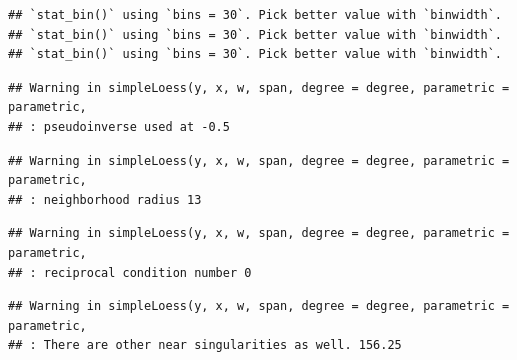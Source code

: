 \documentclass[
]{article}
\newenvironment{Shaded}{\begin{snugshade}}{\end{snugshade}}
\newcommand{\AttributeTok}[1]{\textcolor[rgb]{0.13,0.29,0.53}{#1}}
\newcommand{\FunctionTok}[1]{\textcolor[rgb]{0.13,0.29,0.53}{\textbf{#1}}}
\newcommand{\NormalTok}[1]{#1}
\newcommand{\OtherTok}[1]{\textcolor[rgb]{0.56,0.35,0.01}{#1}}
\newcommand{\SpecialCharTok}[1]{\textcolor[rgb]{0.81,0.36,0.00}{\textbf{#1}}}
\newcommand{\StringTok}[1]{\textcolor[rgb]{0.31,0.60,0.02}{#1}}
\begin{document}
\begin{Shaded}
\end{Shaded}

\begin{verbatim}
## `stat_bin()` using `bins = 30`. Pick better value with `binwidth`.
## `stat_bin()` using `bins = 30`. Pick better value with `binwidth`.
## `stat_bin()` using `bins = 30`. Pick better value with `binwidth`.
\end{verbatim}

\begin{verbatim}
## Warning in simpleLoess(y, x, w, span, degree = degree, parametric = parametric,
## : pseudoinverse used at -0.5
\end{verbatim}

\begin{verbatim}
## Warning in simpleLoess(y, x, w, span, degree = degree, parametric = parametric,
## : neighborhood radius 13
\end{verbatim}

\begin{verbatim}
## Warning in simpleLoess(y, x, w, span, degree = degree, parametric = parametric,
## : reciprocal condition number 0
\end{verbatim}

\begin{verbatim}
## Warning in simpleLoess(y, x, w, span, degree = degree, parametric = parametric,
## : There are other near singularities as well. 156.25
\end{verbatim}
\end{document}

